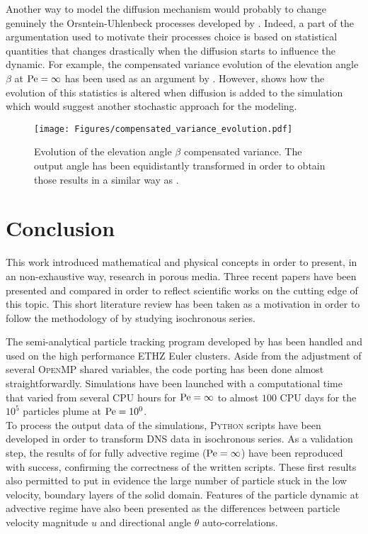 Another way to model the diffusion mechanism would probably to change genuinely the Orsntein-Uhlenbeck processes developed by \citet{Meyer2016}. 
Indeed, a part of the argumentation used to motivate their processes choice is based on statistical quantities that changes drastically when the diffusion starts to influence the dynamic.
For example, the compensated variance evolution of the elevation angle $\beta$ at $\mathrm{Pe} = \infty$ has been used as an argument by \citeauthor{Meyer2016}.
However,  shows how the evolution of this statistics is altered when diffusion is added to the simulation which would suggest another stochastic approach for the modeling.
\begin{figure}
	\centering
	\texttt{[image: Figures/compensated\_variance\_evolution.pdf]}
	\caption{Evolution of the elevation angle $\beta$ compensated variance. The output angle has been equidistantly transformed in order to obtain those results in a similar way as \citet{Meyer2016}.}
	\label{fig:compensated_variance_evolution}
\end{figure}

\chapter{Conclusion}
This work introduced mathematical and physical concepts in order to present, in an non-exhaustive way, research in porous media.
Three recent papers have been presented and compared in order to reflect scientific works on the cutting edge of this topic.
This short literature review has been taken as a motivation in order to follow the methodology of \citet{Meyer2016} by studying isochronous series.

The semi-analytical particle tracking program developed by \citet{Meyer2017} has been handled and used on the high performance ETHZ Euler clusters.
Aside from the adjustment of several \textsc{OpenMP} shared variables, the code porting has been done almost straightforwardly.
Simulations have been launched with a computational time that varied from several CPU hours for $\mathrm{Pe}=\infty$ to almost $100$ CPU days for the $10^5$ particles plume at $\mathrm{Pe}=10^0$.\\
To process the output data of the simulations, \textsc{Python} scripts have been developed in order to transform DNS data in isochronous series. 
As a validation step, the results of \citet{Meyer2016} for fully advective regime ($\mathrm{Pe}=\infty$) have been reproduced with success, confirming the correctness of the written scripts.
These first results also permitted to put in evidence the large number of particle stuck in the low velocity, boundary layers of the solid domain.
Features of the particle dynamic at advective regime have also been presented as the differences between particle velocity magnitude $u$ and directional angle $\theta$ auto-correlations.

